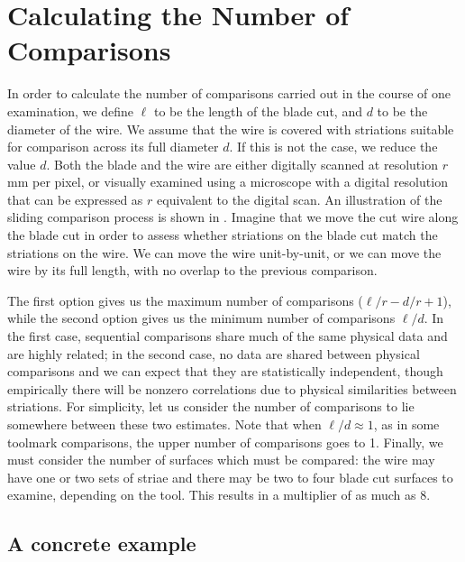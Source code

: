 \documentclass[9pt,twocolumn,twoside]{pnas-new}\usepackage[]{graphicx}\usepackage[dvipsnames]{xcolor}
\providecommand{\DIFadd}[1]{{\protect\color{blue}\uwave{#1}}} %
\providecommand{\DIFdel}[1]{{\protect\color{red}\sout{#1}}}                      %
\providecommand{\DIFaddbegin}{} %
\providecommand{\DIFaddend}{} %
\providecommand{\DIFdelbegin}{} %
\providecommand{\DIFdelend}{} %
\newcommand{\DIFscaledelfig}{0.5}
\newlength{\DIFdelgraphicswidth} %
\newlength{\DIFdelgraphicsheight} %
\newcommand{\DIFaddincludegraphics}[2][]{{\color{blue}\fbox{\DIFOincludegraphics[#1]{#2}}}} %
\newcommand{\DIFdelincludegraphics}[2][]{%
\sbox{\DIFdelgraphicsbox}{\DIFOincludegraphics[#1]{#2}}%
\settoboxwidth{\DIFdelgraphicswidth}{\DIFdelgraphicsbox} %
\settoboxtotalheight{\DIFdelgraphicsheight}{\DIFdelgraphicsbox} %
\scalebox{\DIFscaledelfig}{%
\parbox[b]{\DIFdelgraphicswidth}{\usebox{\DIFdelgraphicsbox}\\[-\baselineskip] \rule{\DIFdelgraphicswidth}{0em}}\llap{\resizebox{\DIFdelgraphicswidth}{\DIFdelgraphicsheight}{%
\setlength{\unitlength}{\DIFdelgraphicswidth}%
\begin{picture}(1,1)%
\thicklines\linethickness{2pt} %
{\color[rgb]{1,0,0}\put(0,0){\framebox(1,1){}}}%
{\color[rgb]{1,0,0}\put(0,0){\line( 1,1){1}}}%
{\color[rgb]{1,0,0}\put(0,1){\line(1,-1){1}}}%
\end{picture}%
}\hspace*{3pt}}} %
} %
\DeclareRobustCommand{\DIFaddbegin}{\DIFOaddbegin \let\includegraphics\DIFaddincludegraphics} %
\DeclareRobustCommand{\DIFaddend}{\DIFOaddend \let\includegraphics\DIFOincludegraphics} %
\DeclareRobustCommand{\DIFdelbegin}{\DIFOdelbegin \let\includegraphics\DIFdelincludegraphics} %
\DeclareRobustCommand{\DIFdelend}{\DIFOaddend \let\includegraphics\DIFOincludegraphics} %
\begin{document}
\section*{Calculating the Number of Comparisons}

In order to calculate the number of comparisons carried out in the course of one examination, we define \DIFdelbegin \DIFdel{$\ell$ }\DIFdelend \DIFaddbegin \DIFadd{$b$ }\DIFaddend to be the length of the blade cut, and $d$ to be the diameter of the wire.
We assume that the wire is covered with striations suitable for comparison across its full diameter $d$.
If this is not the case, we reduce the value $d$.
Both the blade and the wire are either digitally scanned at resolution $r$ mm per pixel, or visually examined using a microscope with a digital resolution that can be expressed as $r$ equivalent to the digital scan.
An illustration of the sliding comparison process is shown in .
Imagine that we move the cut wire along the blade cut in order to assess whether striations on the blade cut match the striations on the wire.
We can move the wire unit-by-unit, or we can move the wire by its full length, with no overlap to the previous comparison.

The first option gives us the maximum number of comparisons (\DIFdelbegin \DIFdel{$\ell/r - d/r + 1$}\DIFdelend \DIFaddbegin \DIFadd{$b/r - d/r + 1$}\DIFaddend ), while the second option gives us the minimum number of comparisons \DIFdelbegin \DIFdel{$\ell/d$}\DIFdelend \DIFaddbegin \DIFadd{$b/d$}\DIFaddend .
In the first case, sequential comparisons share much of the same physical data and are highly related; in the second case, no data are shared between physical comparisons and we can expect that they are statistically independent, though empirically there will be nonzero correlations due to physical similarities between striations.
For simplicity, let us consider the number of comparisons to lie somewhere between these two estimates.
Note that when \DIFdelbegin \DIFdel{$\ell/d \approx 1$}\DIFdelend \DIFaddbegin \DIFadd{$b/d \approx 1$}\DIFaddend , as in some toolmark comparisons, the upper number of comparisons goes to 1.
Finally, we must consider the number of surfaces which must be compared: the wire may have one or two sets of striae and there may be  two to four blade cut surfaces to examine, depending on the tool.
This results in a multiplier of as much as 8.

\subsection*{A concrete example}
\end{document}
